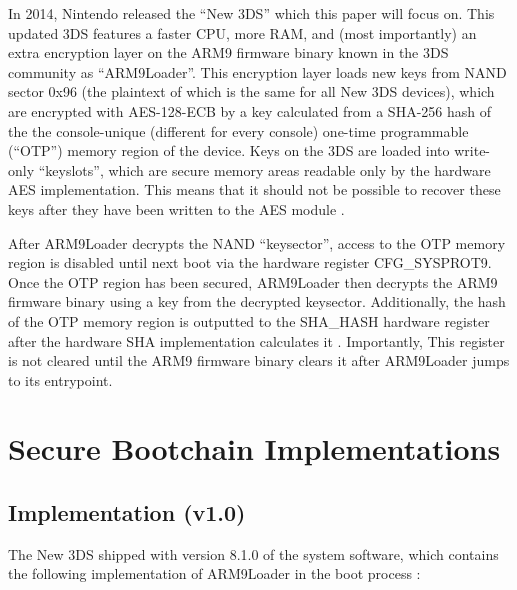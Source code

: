 \documentclass[journal]{IEEEtran}
\begin{document}
In 2014, Nintendo released the ``New 3DS'' which this paper will focus on. This
updated 3DS features a faster CPU, more RAM, and (most importantly) an extra
encryption layer on the ARM9 firmware binary known in the 3DS community as
``ARM9Loader''. This encryption layer loads new keys from NAND sector 0x96 (the
plaintext of which is the same for all New 3DS devices), which are encrypted
with AES-128-ECB by a key calculated from a SHA-256 hash of the the
console-unique (different for every console) one-time programmable (``OTP'')
memory region of the device. Keys on the 3DS are loaded into write-only
``keyslots'', which are secure memory areas readable only by the hardware AES
implementation. This means that it should not be possible to recover these keys
after they have been written to the AES module \cite{AES_Registers}.

After ARM9Loader decrypts the NAND ``keysector'', access to the OTP memory region
is disabled until next boot via the hardware register CFG\_SYSPROT9. Once the
OTP region has been secured, ARM9Loader then decrypts the ARM9 firmware binary
using a key from the decrypted keysector. Additionally, the hash of the OTP
memory region is outputted to the SHA\_HASH hardware register after the hardware
SHA implementation calculates it \cite{SHA_Registers}. Importantly, This
register is not cleared until the ARM9 firmware binary clears it after
ARM9Loader jumps to its entrypoint.

\section{Secure Bootchain Implementations}

\subsection{Implementation (v1.0)}

The New 3DS shipped with version 8.1.0 of the system software, which contains
the following implementation of ARM9Loader in the boot process \cite{FIRM}:
\end{document}
